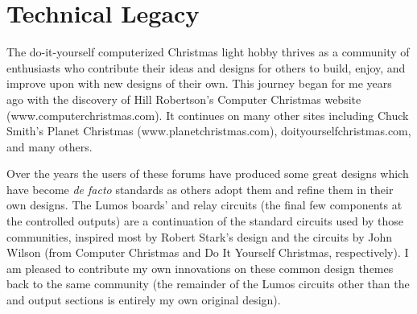 \section*{Technical Legacy}
The do-it-yourself computerized Christmas light hobby thrives as a community of enthusiasts
who contribute their ideas and designs for others to build, enjoy, and improve upon with new
designs of their own.  
This journey began for me years ago with the discovery of Hill Robertson's Computer Christmas
website ({\ttfamily www.computerchristmas.com}).  It continues on many other sites including 
Chuck Smith's Planet Christmas ({\ttfamily www.planetchrist\-mas\-.com}), 
{\ttfamily doityourselfchristmas.com}, and many others.  

Over the years the users of these forums have produced some great designs which have become
\emph{de facto} standards as others adopt them and refine them in their own designs.  The Lumos
boards'  and  relay circuits (the final few components at the controlled
outputs) are a continuation of the standard circuits used by those communities, inspired most
by Robert Stark's  design and the   circuits by John Wilson (from Computer
Christmas and Do It Yourself Christmas, respectively).  I am pleased to contribute my own
innovations on these common design themes back to the same community (the remainder of the
Lumos circuits other than the  and  output sections is entirely
my own original design).
